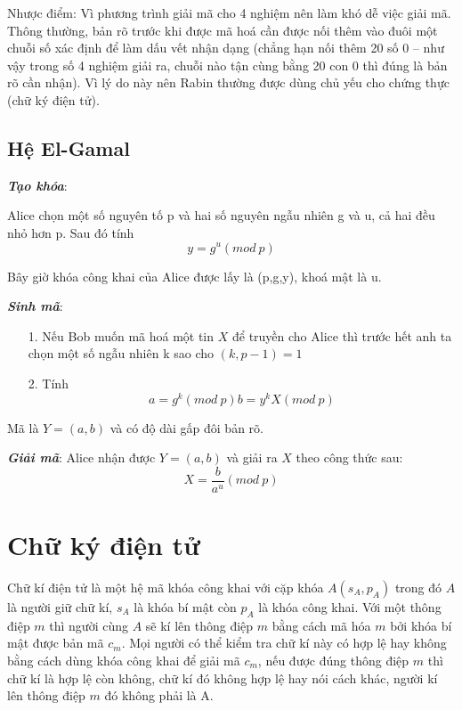 \documentclass[a4paper,12pt]{report}
\begin{document}
Nhược điểm: Vì phương trình giải mã cho 4 nghiệm nên làm khó dễ việc giải mã. Thông thường, bản rõ trước khi được mã hoá cần được nối thêm vào đuôi một chuỗi số xác định để làm dấu vết nhận dạng (chẳng hạn nối thêm 20 số 0 – như vậy trong số 4 nghiệm giải ra, chuỗi nào tận cùng bằng 20 con 0 thì đúng là bản rõ cần nhận). Vì lý do này nên Rabin thường được dùng chủ yếu cho chứng thực (chữ ký điện tử).
\subsection*{Hệ El-Gamal}
\textbf{\textit{Tạo khóa}}:

Alice chọn một số nguyên tố p và hai số nguyên ngẫu nhiên g và u, cả hai đều nhỏ hơn p. Sau đó tính 
\begin{displaymath}
y = g^u (mod \ p)
\end{displaymath}

Bây giờ khóa công khai của Alice được lấy là (p,g,y), khoá mật là u.

\textbf{\textit{Sinh mã}}:
\begin{itemize}
\item[1. ] Nếu Bob muốn mã hoá một tin $X$ để truyền cho Alice thì trước hết anh ta chọn một số ngẫu nhiên k sao cho $(k,p-1) = 1$
\item[2. ] Tính 
\begin{displaymath}
a = g^k(mod \ p)
b = y^kX(mod \ p)
\end{displaymath}
\end{itemize}

Mã là $Y = (a,b)$ và có độ dài gấp đôi bản rõ.

\textbf{\textit{Giải mã}}: Alice nhận được $Y = (a,b)$ và giải ra $X$ theo công thức sau:
\begin{displaymath}
X = \frac{b}{a^u} (mod \ p)
\end{displaymath}
\section{Chữ ký điện tử}
Chữ kí điện tử là một hệ mã khóa công khai với cặp khóa $A(s_A, p_A)$ trong đó $A$ là người giữ chữ kí, $s_A$ là khóa bí mật còn $p_A$ là khóa công khai. Với một thông điệp $m$ thì người cùng $A$ sẽ kí lên thông điệp $m$ bằng cách mã hóa $m$ bởi khóa bí mật được bản mã $c_m$. Mọi người có thể kiểm tra chữ kí này có hợp lệ hay không bằng cách dùng khóa công khai để giải mã $c_m$, nếu được đúng thông điệp $m$ thì chữ kí là hợp lệ còn không, chữ kí đó không hợp lệ hay nói cách khác, người kí lên thông điệp $m$ đó không phải là A.
\end{document}
